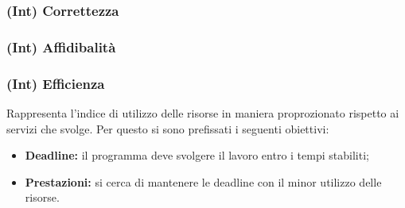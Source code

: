 \subsubsection{(Int) Correttezza}
\subsubsection{(Int) Affidibalità}
\subsubsection{(Int) Efficienza}
Rappresenta l'indice di utilizzo delle risorse in maniera proprozionato rispetto ai servizi che svolge. Per questo si sono prefissati i seguenti obiettivi:
\begin{itemize}
	\item{\textbf{Deadline:}  il programma deve svolgere il lavoro entro i tempi stabiliti;}
	\item{\textbf{Prestazioni:} si cerca di mantenere le deadline con il minor utilizzo delle risorse.}
\end{itemize}

